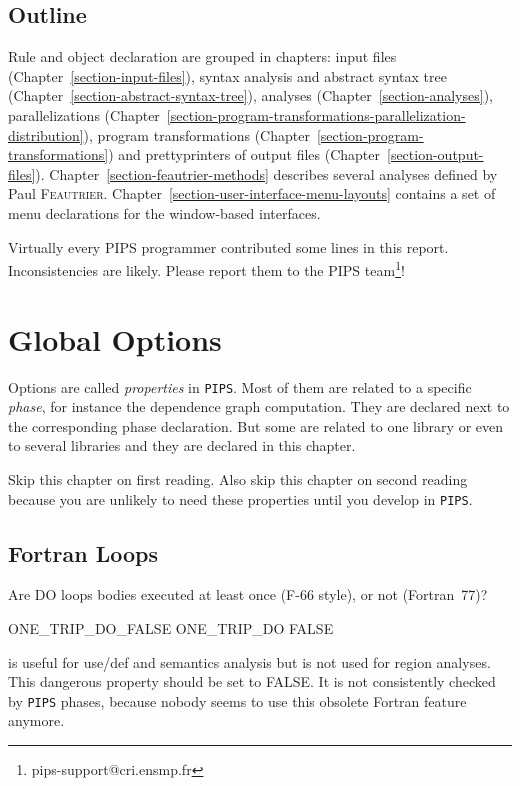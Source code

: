 \documentclass[a4paper]{report}
\newcommand{\Pips}{\texttt{PIPS}}
\begin{document}
\section{Outline}


Rule and object declaration are grouped in chapters: input files
(Chapter~\ref{section-input-files}), syntax analysis and abstract
syntax tree (Chapter~\ref{section-abstract-syntax-tree}), analyses
(Chapter~\ref{section-analyses}), parallelizations
(Chapter~\ref{section-program-transformations-parallelization-distribution}),
program transformations
(Chapter~\ref{section-program-transformations}) and prettyprinters of
output files (Chapter~\ref{section-output-files}).
Chapter~\ref{section-feautrier-methods} describes several analyses
defined by Paul
\textsc{Feautrier}. Chapter~\ref{section-user-interface-menu-layouts}
contains a set of menu declarations for the window-based interfaces.

Virtually every PIPS programmer contributed some lines in this
report. Inconsistencies are likely. Please report them to the PIPS
team\footnote{pips-support@cri.ensmp.fr}!

\tableofcontents



\chapter{Global Options}
\label{chapter-global-options}

Options are called {\em properties} in \Pips{}. Most of them are
related to a specific {\em phase}, for instance the dependence graph
computation. They are declared next to the corresponding phase
declaration. But some are related to one library or even to several
libraries and they are declared in this chapter.

Skip this chapter on first reading.  Also skip this chapter on second
reading because you are unlikely to need these properties until you
develop in {\tt PIPS}.


\section{Fortran Loops}

Are DO loops bodies executed at least once (F-66 style), or not (Fortran~77)?
\begin{PipsProp}{ONE_TRIP_DO_FALSE}
ONE_TRIP_DO FALSE
\end{PipsProp}
is useful for use/def and semantics analysis but is not used for
region analyses. This dangerous property should be set to FALSE. It is
not consistently checked by {\tt PIPS} phases, because nobody seems to
use this obsolete Fortran feature anymore.
\end{document}

